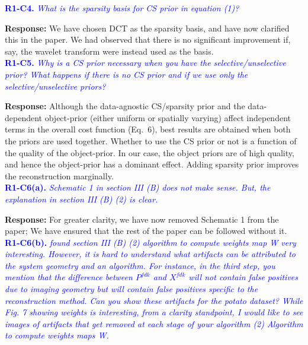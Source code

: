 \documentclass{article}
\begin{document}
\textcolor{blue}{\textbf{R1-C4.}\textit{ What is the sparsity basis for CS prior in equation (1)? }}

\textbf{Response:} We have chosen DCT as the sparsity basis, and have now clarified this in the paper. We had observed that there is no significant improvement if, say, the wavelet transform were instead used as the basis.\\

\textcolor{blue}{\textbf{R1-C5.} \textit{ Why is a CS prior necessary when you have the selective/unselective prior? What happens if there is no CS prior and if we use only the selective/unselective priors?}}

\textbf{Response:} Although the data-agnostic CS/sparsity  prior and the data-dependent object-prior  (either uniform or spatially varying) affect independent terms in the overall cost function (Eq.~6), best results are obtained when both the priors are used together. Whether to use the CS prior or not is a function of the quality of the object-prior. In our case, the object priors are of high quality, and hence the object-prior has a dominant effect. Adding sparsity prior improves the reconstruction marginally.\\

\textcolor{blue}{\textbf{R1-C6(a).}\textit{ Schematic 1 in section III (B) does not make sense. But, the explanation in section III (B) (2) is clear.}}

\textbf{Response:}  For greater clarity, we have now removed Schematic 1 from the paper; We have  ensured that the rest of the paper can be followed without it.\\

\textcolor{blue}{\textbf{R1-C6(b).}\textit{ found section III (B) (2) algorithm to compute weights map W very interesting. However, it is hard to understand what artifacts can be attributed to the system geometry and an algorithm. For instance, in the third step, you mention that the difference between $P^{fdk}$ and $X^{fdk}$ will not contain false positives due to imaging geometry but will contain false positives specific to the reconstruction method. Can you show these artifacts for the potato dataset? While Fig. 7 showing weights is interesting, from a clarity standpoint, I would like to see images of artifacts that get removed at each stage of your algorithm (2) Algorithm to compute weights maps W.}}
\end{document}
